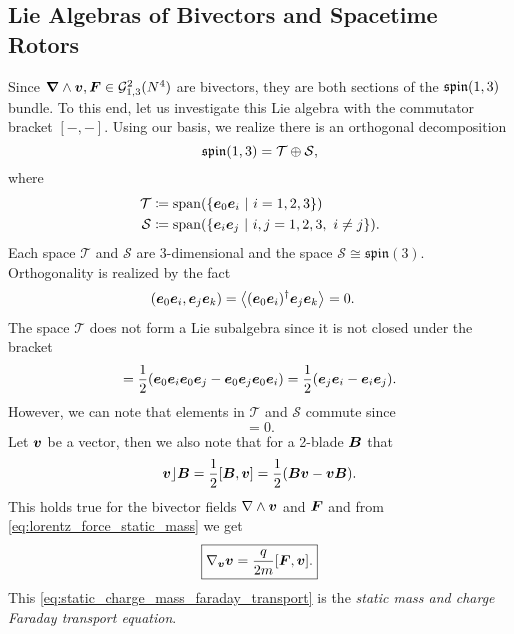 \subsection{Lie Algebras of Bivectors and Spacetime Rotors}

Since $\boldsymbol{\nabla} \wedge {\boldsymbol{v}}, \boldsymbol{F} \in \mathcal{G}_{1,3}^2(N^4)$ are bivectors, they are both sections of the $\mathfrak{spin}(1,3)$ bundle. To this end, let us investigate this Lie algebra with the commutator bracket $[-,-]$. Using our basis, we realize there is an orthogonal decomposition 
\begin{equation}
    \label{eq:spin_algebra_split}
    \mathfrak{spin}(1,3) = \mathcal{T} \oplus \mathcal{S},
\end{equation}
where 
\begin{align}
    \mathcal{T} &\coloneqq \mathrm{span}(\{\boldsymbol{e}_0 \boldsymbol{e}_i ~\vert~ i = 1,2,3\})\\
    \mathcal{S} &\coloneqq \mathrm{span}(\{\boldsymbol{e}_i \boldsymbol{e}_j ~\vert~ i,j = 1,2,3, ~ i\neq j\}).
\end{align}
Each space $\mathcal{T}$ and $\mathcal{S}$ are 3-dimensional and the space $\mathcal{S}\cong \mathfrak{spin}(3)$. Orthogonality is realized by the fact
\begin{align}
    (\boldsymbol{e}_0 \boldsymbol{e}_i, \boldsymbol{e}_j \boldsymbol{e}_k) &= \left\langle(\boldsymbol{e}_0 \boldsymbol{e}_i)^\dagger \boldsymbol{e}_j \boldsymbol{e}_k\right\rangle_{} = 0.
\end{align}
The space $\mathcal{T}$ does not form a Lie subalgebra since it is not closed under the bracket
\begin{equation}
    [\blade{e}_0\blade{e}_i,\blade{e}_0 \blade{e}_j] = \frac{1}{2} (\blade{e}_0 \blade{e}_i \blade{e}_0 \blade{e}_j - \blade{e}_0 \blade{e}_j \blade{e}_0 \blade{e}_i) = \frac{1}{2}(\blade{e}_j \blade{e}_i-\blade{e}_i \blade{e}_j).
\end{equation}
However, we can note that elements in $\mathcal{T}$ and $\mathcal{S}$ commute since
\begin{equation}
[e_0 e_i,e_j e_k] = 0.
\end{equation}
Let $\boldsymbol{v}$ be a vector, then we also note that for a 2-blade $\boldsymbol{B}$ that
\begin{equation}
    \boldsymbol{v} \rfloor \boldsymbol{B} = \frac{1}{2}[\boldsymbol{B},\boldsymbol{v}] = \frac{1}{2}(\boldsymbol{B}\boldsymbol{v} - \boldsymbol{v}\boldsymbol{B}).
\end{equation}
This holds true for the bivector fields $\nabla \wedge \boldsymbol{v}$ and $\boldsymbol{F}$ and from \cref{eq:lorentz_force_static_mass} we get
\begin{equation}
    \label{eq:static_charge_mass_faraday_transport}
    \boxed{\nabla_{\boldsymbol{v}} \boldsymbol{v} = \frac{q}{2m} [\boldsymbol{F},\boldsymbol{v}].}
\end{equation}
This \cref{eq:static_charge_mass_faraday_transport} is the \emph{static mass and charge Faraday transport equation}.

